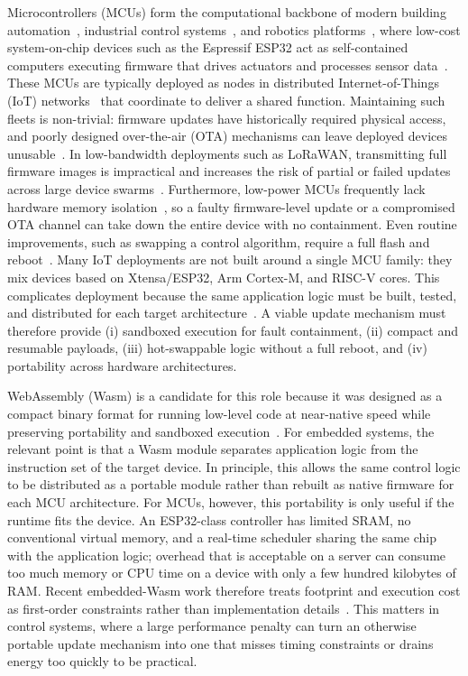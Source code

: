 \documentclass[12pt, a4paper]{report}
\begin{document}
Microcontrollers (MCUs) form the computational backbone of modern building automation~\cite{jia2019smartbuildings}, industrial control systems~\cite{wollschlaeger2017future}, and robotics platforms~\cite{chikurtev2026esp32}, where low-cost system-on-chip devices such as the Espressif ESP32 act as self-contained computers executing firmware that drives actuators and processes sensor data~\cite{hercog2023esp32}. These MCUs are typically deployed as nodes in distributed Internet-of-Things (IoT) networks~\cite{atzori2010iot} that coordinate to deliver a shared function. Maintaining such fleets is non-trivial: firmware updates have historically required physical access, and poorly designed over-the-air (OTA) mechanisms can leave deployed devices unusable~\cite{eljaouhari2022secure}. In low-bandwidth deployments such as LoRaWAN, transmitting full firmware images is impractical and increases the risk of partial or failed updates across large device swarms~\cite{desimone2025bpatch,bauwens2020ota}. Furthermore, low-power MCUs frequently lack hardware memory isolation~\cite{zandberg2022femto,dessouky2023pipmpu}, so a faulty firmware-level update or a compromised OTA channel can take down the entire device with no containment. Even routine improvements, such as swapping a control algorithm, require a full flash and reboot~\cite{dunkels2006runtime,ruizdeazua2024modular}. Many IoT deployments are not built around a single MCU family: they mix devices based on Xtensa/ESP32, Arm Cortex-M, and RISC-V cores. This complicates deployment because the same application logic must be built, tested, and distributed for each target architecture~\cite{zandberg2022femto}. A viable update mechanism must therefore provide (i) sandboxed execution for fault containment, (ii) compact and resumable payloads, (iii) hot-swappable logic without a full reboot, and (iv) portability across hardware architectures.

WebAssembly (Wasm) is a candidate for this role because it was designed as a compact binary format for running low-level code at near-native speed while preserving portability and sandboxed execution~\cite{haas2017webassembly}. For embedded systems, the relevant point is that a Wasm module separates application logic from the instruction set of the target device. In principle, this allows the same control logic to be distributed as a portable module rather than rebuilt as native firmware for each MCU architecture. For MCUs, however, this portability is only useful if the runtime fits the device. An ESP32-class controller has limited SRAM, no conventional virtual memory, and a real-time scheduler sharing the same chip with the application logic; overhead that is acceptable on a server can consume too much memory or CPU time on a device with only a few hundred kilobytes of RAM. Recent embedded-Wasm work therefore treats footprint and execution cost as first-order constraints rather than implementation details~\cite{li2022wait,moron2025benchmarking}. This matters in control systems, where a large performance penalty can turn an otherwise portable update mechanism into one that misses timing constraints or drains energy too quickly to be practical.
\end{document}
